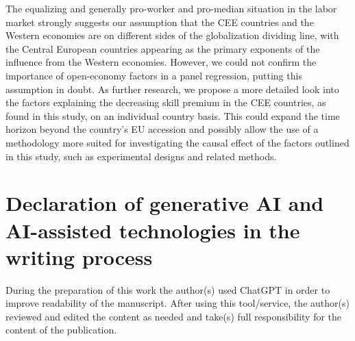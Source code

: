 \documentclass[11pt]{article}
\begin{document}
The equalizing and generally pro-worker and pro-median situation in the labor market strongly suggests our assumption that the CEE countries and the Western economies are on different sides of the globalization dividing line, with the Central European countries appearing as the primary exponents of the influence from the Western economies. However, we could not confirm the importance of open-economy factors in a panel regression, putting this assumption in doubt. As further research, we propose a more detailed look into the factors explaining the decreasing skill premium in the CEE countries, as found in this study, on an individual country basis. This could expand the time horizon beyond the country’s EU accession and possibly allow the use of a methodology more suited for investigating the causal effect of the factors outlined in this study, such as experimental designs and related methods.


\newpage

\section*{Declaration of generative AI and AI-assisted technologies in the writing process}
During the preparation of this work the author(s) used ChatGPT in order to improve readability of the manuscript. After using this tool/service, the author(s) reviewed and edited the content as needed and take(s) full responsibility for the content of the publication.









\newpage
\end{document}
